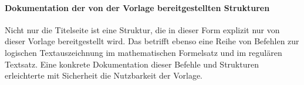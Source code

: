 \paragraph{Dokumentation der von der Vorlage bereitgestellten Strukturen}

Nicht nur die Titelseite ist eine Struktur, die in dieser Form explizit nur von dieser Vorlage bereitgestellt wird. Das betrifft ebenso eine Reihe von Befehlen zur logischen Textauszeichnung im mathematischen Formelsatz und im regulären Textsatz. Eine konkrete Dokumentation dieser Befehle und Strukturen erleichterte mit Sicherheit die Nutzbarkeit der Vorlage.


